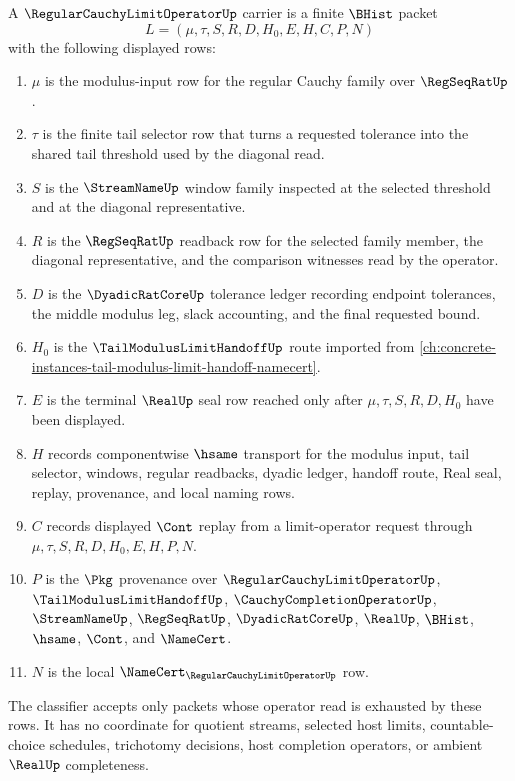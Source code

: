 \begin{definition}
\label{def:regular-cauchy-limit-operator-carrier}
A $\RegularCauchyLimitOperatorUp$ carrier is a finite $\BHist$ packet
$$
L=(\mu,\tau,S,R,D,H_0,E,H,C,P,N)
$$
with the following displayed rows:
\begin{enumerate}
\item $\mu$ is the modulus-input row for the regular Cauchy family over $\RegSeqRatUp$.
\item $\tau$ is the finite tail selector row that turns a requested tolerance into the shared tail threshold used by the diagonal read.
\item $S$ is the $\StreamNameUp$ window family inspected at the selected threshold and at the diagonal representative.
\item $R$ is the $\RegSeqRatUp$ readback row for the selected family member, the diagonal representative, and the comparison witnesses read by the operator.
\item $D$ is the $\DyadicRatCoreUp$ tolerance ledger recording endpoint tolerances, the middle modulus leg, slack accounting, and the final requested bound.
\item $H_0$ is the $\TailModulusLimitHandoffUp$ route imported from \autoref{ch:concrete-instances-tail-modulus-limit-handoff-namecert}.
\item $E$ is the terminal $\RealUp$ seal row reached only after $\mu,\tau,S,R,D,H_0$ have been displayed.
\item $H$ records componentwise $\hsame$ transport for the modulus input, tail selector, windows, regular readbacks, dyadic ledger, handoff route, Real seal, replay, provenance, and local naming rows.
\item $C$ records displayed $\Cont$ replay from a limit-operator request through $\mu,\tau,S,R,D,H_0,E,H,P,N$.
\item $P$ is the $\Pkg$ provenance over $\RegularCauchyLimitOperatorUp$, $\TailModulusLimitHandoffUp$, $\CauchyCompletionOperatorUp$, $\StreamNameUp$, $\RegSeqRatUp$, $\DyadicRatCoreUp$, $\RealUp$, $\BHist$, $\hsame$, $\Cont$, and $\NameCert$.
\item $N$ is the local $\NameCert_{\RegularCauchyLimitOperatorUp}$ row.
\end{enumerate}
The classifier accepts only packets whose operator read is exhausted by these rows. It has no coordinate for quotient streams, selected host limits, countable-choice schedules, trichotomy decisions, host completion operators, or ambient $\RealUp$ completeness.
\end{definition}

